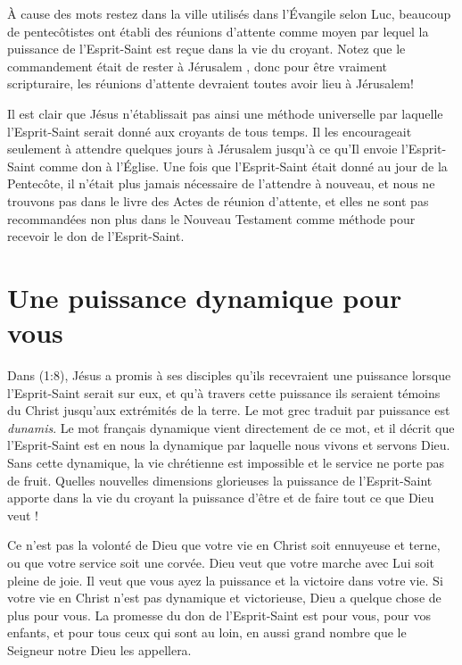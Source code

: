\begin{specialpar}{}
À cause des mots \og restez dans la ville \fg{} utilisés dans
 l'Évangile \linebreak
 selon Luc, beaucoup de pentecôtistes ont établi des \og réunions
 d'attente \fg{} comme moyen par lequel la puissance de l'Esprit-Saint est
 reçue dans la vie du croyant. Notez que le commandement était de \og rester
 à Jérusalem \fg{} ,
 donc pour être vraiment scripturaire, les réunions d'attente devraient toutes
 avoir lieu à Jérusalem!
\end{specialpar}

Il est clair que Jésus n'établissait pas ainsi une méthode universelle par
 laquelle l'Esprit-Saint serait donné aux croyants de tous temps. Il les
 encourageait seulement à attendre quelques jours à Jérusalem jusqu'à ce
 qu'Il envoie l'Esprit-Saint comme don à l'Église. Une fois que
 l'Esprit-Saint était donné au jour de la Pentecôte, il n'était plus
 jamais nécessaire de l'attendre à nouveau, et nous ne trouvons pas dans
 le livre des Actes de réunion d'attente, et elles ne sont pas recommandées
 non plus dans le Nouveau Testament comme méthode pour recevoir le don de
 l'Esprit-Saint.


\section{Une puissance dynamique pour vous}

Dans (1:8), Jésus a promis à ses disciples
 qu'ils recevraient une puissance lorsque l'Esprit-Saint serait
 sur eux, et qu'à travers cette puissance ils seraient témoins
 du Christ jusqu'aux extrémités de la terre.
 Le mot grec traduit par \og puissance \fg{} est \emph{dunamis}.
 Le mot français \og dynamique \fg{} vient directement de ce mot,
 et il décrit que l'Esprit-Saint est en nous \ocadr la dynamique par laquelle
 nous vivons et servons Dieu. Sans cette dynamique, la vie chrétienne est
 impossible et le service ne porte pas de fruit.
 Quelles nouvelles dimensions glorieuses la puissance de l'Esprit-Saint
 apporte dans la vie du croyant \ocadr la puissance d'être et de faire
 tout ce que Dieu veut !

Ce n'est pas la volonté de Dieu que votre vie en Christ soit ennuyeuse
 et terne, ou que votre service soit une corvée.
 Dieu veut que votre marche avec Lui soit pleine de joie.
 Il veut que vous ayez la puissance et la victoire dans votre vie.
 Si votre vie en Christ n'est pas dynamique et victorieuse,
 Dieu a quelque chose de plus pour vous.
 La promesse du don de l'Esprit-Saint est \og pour vous, pour vos enfants,
 et pour tous ceux qui sont au loin,
 en aussi grand nombre que le Seigneur notre Dieu les appellera. \fg{}
\closechapter

